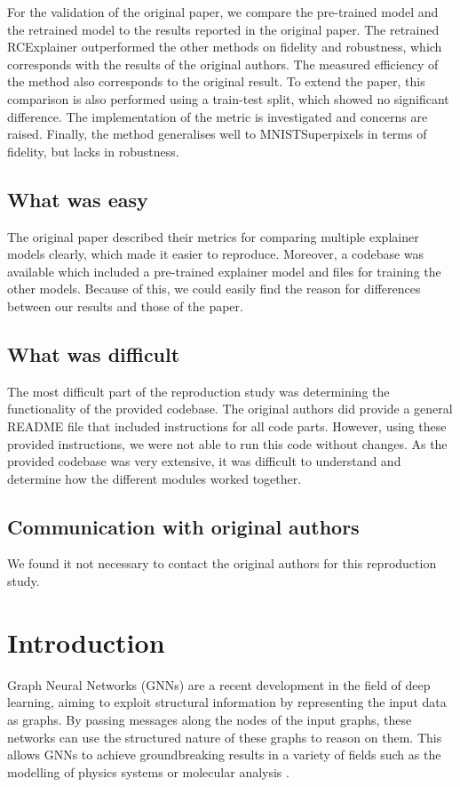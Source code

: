 For the validation of the original paper, we compare the pre-trained model and the retrained model to the results reported in the original paper. The retrained RCExplainer outperformed the other methods on fidelity and robustness, which corresponds with the results of the original authors. The measured efficiency of the method also corresponds to the original result. To extend the paper, this comparison is also performed using a train-test split, which showed no significant difference. The implementation of the metric is investigated and concerns are raised. Finally, the method generalises well to MNISTSuperpixels in terms of fidelity, but lacks in robustness.


\subsection*{What was easy}
The original paper described their metrics for comparing multiple explainer models clearly, which made it easier to reproduce. Moreover, a codebase was available which included a pre-trained explainer model and files for training the other models. Because of this, we could easily find the reason for differences between our results and those of the paper.

\subsection*{What was difficult}
The most difficult part of the reproduction study was determining the functionality of the provided codebase. The original authors did provide a general README file that included instructions for all code parts. However, using these provided instructions, we were not able to run this code without changes. As the provided codebase was very extensive, it was difficult to understand and determine how the different modules worked together.

\subsection*{Communication with original authors}
We found it not necessary to contact the original authors for this reproduction study.

\clearpage

\section{Introduction}
Graph Neural Networks (GNNs) \cite{gnnOG} are a recent development in the field of deep learning, aiming to exploit structural information by representing the input data as graphs. By passing messages along the nodes of the input graphs, these networks can use the structured nature of these graphs to reason on them. This allows GNNs to achieve groundbreaking results in a variety of fields such as the modelling of physics systems or molecular analysis \cite{zhou2020GNNGeneral}.

